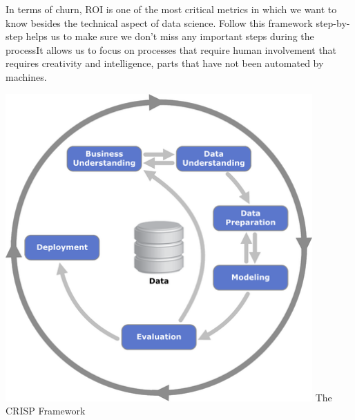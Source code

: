 In terms of churn, ROI is one of the most critical metrics in which we want to know besides the technical aspect of data science. Follow this framework step-by-step helps us to make sure we don't miss any important steps during the processIt allows us to focus on processes that require human involvement that requires creativity and intelligence, parts that have not been automated by machines.

\includegraphics[width=333pt,height=334pt]{CRISP.png}
The CRISP Framework



